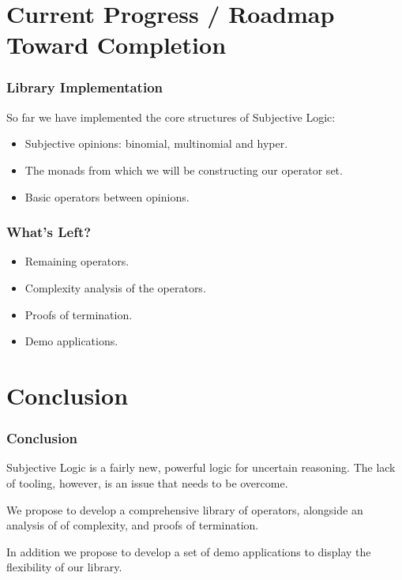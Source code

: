 \documentclass{beamer}
\begin{document}
%
%

\section{Current Progress / Roadmap Toward Completion}

\begin{frame}
\frametitle{Library Implementation}

So far we have implemented the core structures of Subjective Logic:

\begin{itemize}
  \item Subjective opinions: binomial, multinomial and hyper.
  \item The monads from which we will be constructing our operator set.
  \item Basic operators between opinions.
\end{itemize}

\end{frame}


\begin{frame}
\frametitle{What's Left?}

\begin{itemize}
  \item Remaining operators.
  \item Complexity analysis of the operators.
  \item Proofs of termination.
  \item Demo applications.
\end{itemize}

\end{frame}

%
%

\section{Conclusion}

\begin{frame}
\frametitle{Conclusion}

Subjective Logic is a fairly new, powerful logic for uncertain reasoning. The lack
of tooling, however, is an issue that needs to be overcome.

We propose to develop a comprehensive library of operators, alongside an analysis of
of complexity, and proofs of termination.

In addition we propose to develop a set of demo applications to display the flexibility
of our library.
\end{frame}
\end{document}
